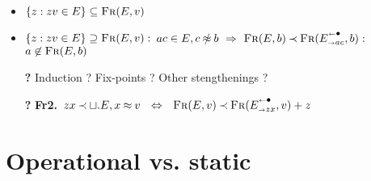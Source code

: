 \documentclass[leqno]{article}
\newcommand{\func}[1]{\mbox{\sc #1}}
\newcommand{\f}[1]{\func{#1}}
\begin{document}
\begin{itemize}
\item ${\{z:zv\in E\} \subseteq \f{Fr}(E,v)}$
\item ${\{z:zv\in E\} \supseteq \f{Fr}(E,v)}:$\hfill 
${ac\in E,c\notEq b\ \impl\  \f{Fr}(E,b) \Incl \f{Fr}(\rem E{ac},b)}:$ \hfill
$a\not\in\f{Fr}(E,b)$
\item[{\bf ?}] Induction ? Fix-points ? Other stengthenings ? 
\item[{\bf ?}] {\bf Fr2.}\ 
${zx\Incl \ch.E, x\Eq v}\ \ \Iff\ \ {\f{Fr}(E,v)\Incl \f{Fr}(\rem E{zx},v) +z}$
\end{itemize}
%
%
%
%
%

\newpage
\section{Operational vs. static}
\end{document}
